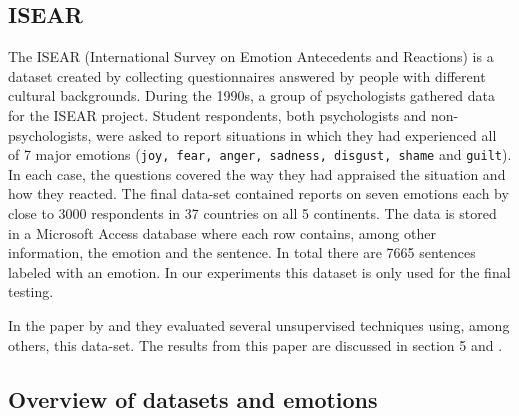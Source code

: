 \documentclass[11pt]{article}
\begin{document}




\subsection{ISEAR}
\label{sec:data:isear}
The ISEAR (International Survey on Emotion Antecedents and Reactions) is a dataset created by collecting questionnaires answered by people with different cultural backgrounds.   
During the 1990s, a group of psychologists gathered data for the ISEAR project. Student respondents, both psychologists and non-psychologists, were asked to report situations in which they had experienced all of 7 major emotions (\texttt{joy, fear, anger, sadness, disgust, shame} and \texttt {guilt}). In each case, the questions covered the way they had appraised the situation and how they reacted. The final data-set contained reports on seven emotions each by close to 3000 respondents in 37 countries on all 5 continents.
The data is stored in a Microsoft Access database where each row contains, among other information, the emotion and the sentence. In total there are 7665 sentences labeled with an emotion. In our experiments this dataset is only used for the final testing.




In the paper by  and  they evaluated several unsupervised techniques using, among others, this data-set. The results from this paper are discussed in section 5 \cite{kim2010evaluation} and \cite{calvo2013emotions}. 





\subsection{Overview of datasets and emotions}
\label{sec:overview}
\end{document}
